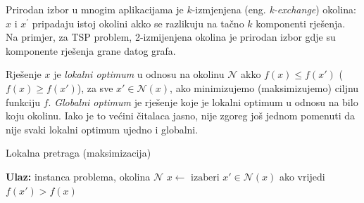 \documentclass[a4paper, utf8, 11pt, colorlinks]{book}
\theoremstyle{definition}
\begin{document}
Prirodan izbor u mnogim aplikacijama je $k$-izmjenjena (eng. \emph{k-exchange}) okolina: $x$ i $x^{'}$ pripadaju istoj okolini akko se razlikuju na tačno $k$ komponenti rješenja. Na primjer, za TSP problem, 2-{izmijenjena} okolina je prirodan izbor gdje su komponente rješenja grane datog grafa.  

  
Rješenje $x$ je \emph{lokalni optimum} u odnosu na okolinu $\mathcal{N}$ akko
$f(x) \leq f(x')$ ($f(x) \geq f(x')$), za sve $x' \in \mathcal{N}(x)$, ako minimizujemo (maksimizujemo) ciljnu funkciju $f$.  \emph{Globalni optimum} je rješenje koje je lokalni optimum u odnosu na bilo koju okolinu.  Iako je to većini čitalaca jasno, nije zgoreg  još jednom pomenuti da nije svaki lokalni optimum ujedno i globalni. 

\begin{algorithm}[!t] 
	\caption{Lokalna pretraga (maksimizacija)}\label{alg:ls}
	\begin{algorithmic}[1]
		\STATE \textbf{Ulaz:} instanca problema, okolina $\mathcal{N}$
		\STATE $ x \gets  \text{ izaberi } x' \in \mathcal{N}(x) $ ako vrijedi  $f(x') > f(x)$ 
		\ENDWHILE
	\end{algorithmic}
\end{algorithm}
\end{document}
